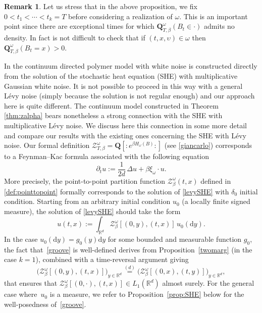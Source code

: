 \documentclass[JEP,XML,SOM,Unicode,published]{cedram}
\let\mathcal\mathscr
\theoremstyle{definition}
\newtheorem{rem}[theorem]{Remark}
\newcommand{\dd}{\mathrm{d}}
\newcommand{\cZ}{{\ensuremath{\mathcal Z}} }
\newcommand{\bQ}{{\ensuremath{\mathbf Q}} }
\newcommand{\bbR}{{\ensuremath{\mathbb R}} }
\let\gD\Delta
\let\ups\upsilon
\let\go\omega
\begin{document}
\begin{rem}
Let us stress that in the above proposition,
we fix \hbox{$0\!<\!t_1\!<\!\cdots\!<\!t_k\!=\!T$}
before considering a realization of $\go$.
This is an important point since there are exceptional times for which $\bQ^{\go}_{T,\beta}(B_{t}\in \cdot)$
admits no density. In fact is not difficult to check that if $(t,x,\ups)\in \go$ then
$\bQ^{\go}_{T,\beta}(B_{t}=x)>0$.
\end{rem}

\label{sec:SHE}

In \cite{AKQ14b} the continuum directed polymer model with white noise is constructed direct\-ly from the solution of the stochastic heat equation (SHE) with multiplicative Gaussian white noise. It is not possible to proceed in this way with a general Lévy noise (simply because the solution is not regular enough) and our approach here is quite different.
The continuum model constructed in Theorem \ref{thm:zalpha} bears nonetheless a strong connection
with the SHE with multiplicative Lévy noise. We discuss here this connection in some more detail and compare our results with the existing ones concerning the SHE with Lévy noise.
Our formal definition $\cZ^{\go}_{T,\beta} = \bQ\left[ \mathbf{:}e^{\beta H_\go(B)}\mathbf{:} \right]$ (see \eqref{giancarlo}) corresponds to a Feynman--Kac formula associated with the following equation
\begin{equation}\label{levySHE}
\partial_t u:= \frac{1}{2d}\, \gD u + \beta \xi_{\go} \cdot u.
\end{equation}
More precisely, the point-to-point partition function $\cZ^{\go}_{\beta}(t,x)$ defined in \eqref{def:pointtopoint}
formally corresponds to the solution of \eqref{levySHE} with
$\delta_0$ initial condition.
Starting from an arbitrary initial condition $u_0$ (a locally finite signed measure), the solution of \eqref{levySHE} should take
the form
\begin{equation}\label{groove}
u(t,x):= \int_{\bbR^d} \cZ^{\go}_{\beta}[(0,y),(t,x)] \, u_0(\dd y).
\end{equation}
In the case $u_0(\dd y) = g_0(y) \dd y$ for some bounded and measurable function $g_0$,
the fact that~\eqref{groove}
is well-defined
derives from Proposition~\ref{twomarg} (in the case $k=1$), combined
with a time-reversal argument giving
\[
\bigl(\cZ^{\go}_{\beta}[(0,y),(t,x)] \bigr)_{y \in \bbR^d}\stackrel{(d)}{=} \bigl(\cZ^{\go}_{\beta}[(0,x),(t,y)]\bigr)_{y \in \bbR^d},
\]
that ensures that $\cZ^{\go}_{\beta}[(0,\cdot),(t,x)]\in L_1(\bbR^d)$
almost surely.
For the general case where~$u_0$ is a measure,
we refer to Proposition~\ref{prop:SHE} below
for the well-posedness of~\eqref{groove}.
\end{document}
